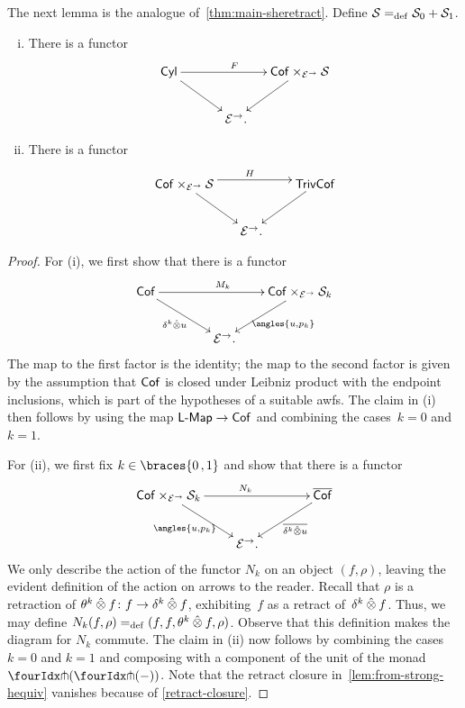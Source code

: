 \documentclass[reqno,10pt,a4paper,oneside,draft]{amsart}
\newcommand{\LL}{\mathsf{L}}
\begin{document}
{{The next lemma is the analogue of~\cref{thm:main-sheretract}.
Define $\mathcal{S} =_{\operatorname{def}}  \mathcal{S}_0 + \mathcal{S}_1$.

\begin{proposition} \label{thm:strong-hequiv} \leavevmode
\begin{enumerate}[(i)]
\item \label{thm:onedir} There is a functor
\[
\xymatrix@!C@C-2.5em{
  \Cyl
  \ar[dr]
  \ar[rr]^F
&&
  \Cof \times_{\cal{E}^\to} \cal{S}
  \ar[dl]
\\&
  \catE^\to
\rlap{.}}
\]
\item \label{thm:twodir} There is a functor
\[
\xymatrix@!C@C-2.5em{
  \Cof \times_{\cal{E}^\to} \cal{S}
  \ar[dr]
  \ar@<4pt>[rr]^{H}
&&
  \TrivCof
  \ar[dl]
\\&
  \catE^\to
\rlap{.}}
\]
\end{enumerate}
\end{proposition}

\begin{proof}
For (i), we first show that there is a functor
\[
\xymatrix@!C@C-2em{
  \Cof
  \ar[dr]_{\kcyl \hatotimes u} \ar[rr]^{M_k}
&&
  \Cof \times_{\cal{E}^\to} \cal{S}_k
  \ar[dl]^{\angles{u, p_k}}
\\&
   \catE^\to
\rlap{.}}
\]
The map to the first factor is the identity; the map to the second factor is given by the assumption that $\mathsf{Cof}$ is closed under Leibniz product with the endpoint inclusions, which is part of the hypotheses of a suitable awfs.
The claim in (i) then follows by using the map $\pCoalg{\LL} \to \Cof$ and combining the cases~$k = 0$ and~$k = 1$.

For (ii), we first fix $k \in \braces{0\,, 1}$ and show that there is a functor
\begin{equation} \label{lem:from-strong-hequiv}
\begin{gathered}
\xymatrix@!C@C-2em{
  \Cof \times_{\cal{E}^\to} \cal{S}_k
  \ar[dr]_{\angles{u, p_k}}
  \ar[rr]^{N_k}
&&
  \overline{\Cof}
  \ar[dl]^-{\overline{\kcyl \hatotimes u}}
\\&
  \catE^\to
\rlap{.}}
\end{gathered}
\end{equation}
We only describe the action of the functor $N_k$ on an object $(f, \rho)$, leaving the evident definition of the action on arrows to the reader.
Recall that $\rho$ is a retraction of $\theta^k \mathbin{\hat{\otimes}} f \colon f \to \delta^k \mathbin{\hat{\otimes}} f$, exhibiting~$f$ as a retract of~$\delta^k \mathbin{\hat{\otimes}} f$.
Thus, we may define $N_k(f, \rho) =_{\operatorname{def}} (f, f, \theta^k \mathbin{\hat{\otimes}} f, \rho)$.
Observe that this definition makes the diagram for $N_k$ commute.
The claim in (ii) now follows by combining the cases $k = 0$ and $k = 1$ and composing with a component of the unit of the monad $\liftl{(\liftr{(-)})}$.
Note that the retract closure in~\eqref{lem:from-strong-hequiv} vanishes because of \cref{retract-closure}.
\end{proof}

}}
\end{document}

